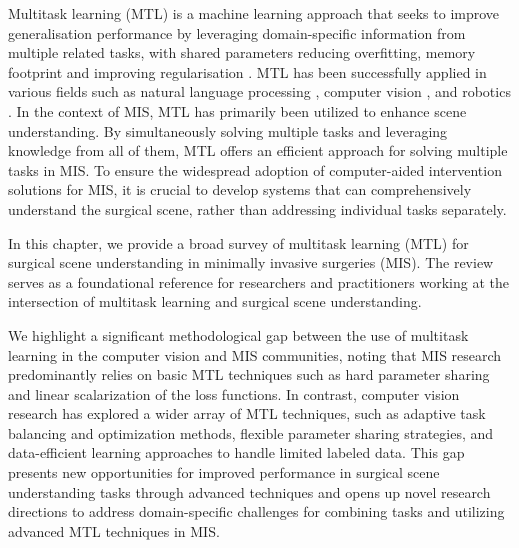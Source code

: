  

Multitask learning (MTL)
is a machine learning approach that seeks to improve generalisation performance by leveraging domain-specific information from multiple related tasks, with shared parameters reducing overfitting,  memory footprint and improving regularisation \citep{rich_caruana}.
MTL has been successfully applied in various fields such as natural language processing \citep{unified_mtl_nlp}, computer vision \citep{fastrcnn}, and robotics \citep{mtopt}.
In the context of MIS, MTL has primarily been utilized to enhance scene understanding. By simultaneously solving multiple tasks and leveraging knowledge from all of them, MTL offers an efficient approach for solving multiple tasks in MIS.
To ensure the widespread adoption of computer-aided intervention solutions for MIS, it is crucial to develop systems that can comprehensively understand the surgical scene, rather than addressing individual tasks separately.

In this chapter, we provide a broad
survey of multitask learning (MTL) for surgical scene understanding in minimally invasive surgeries (MIS). The review serves as a foundational reference for researchers and practitioners working at the intersection of multitask
learning and surgical scene understanding. 



We highlight a significant methodological gap between the use of multitask learning in the computer vision and MIS communities, noting that MIS research predominantly relies on basic MTL techniques such as hard parameter sharing and linear scalarization of the loss functions.
In contrast, computer vision research has explored a wider array of MTL techniques, such as adaptive task balancing and optimization methods, flexible parameter sharing strategies, and data-efficient learning approaches to handle limited labeled data. This gap presents new opportunities for improved performance in surgical scene understanding tasks through advanced techniques and opens up novel research directions to address domain-specific challenges for combining tasks and utilizing advanced MTL techniques in MIS.



